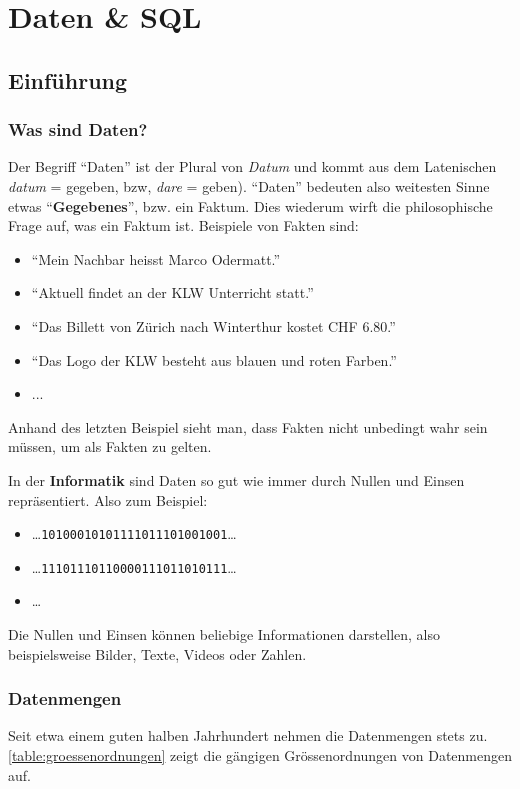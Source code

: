 \chapter{Daten \& SQL}\label{ch:Lektion}
\section{Einführung}

\subsection{Was sind Daten?}

Der Begriff ``Daten'' ist der Plural von \textit{Datum} und kommt aus dem Latenischen \textit{datum} = gegeben, bzw, \textit{dare} = geben). ``Daten'' bedeuten also weitesten Sinne etwas ``\textbf{Gegebenes}'', bzw. ein Faktum. Dies wiederum wirft die philosophische Frage auf, was ein Faktum ist. Beispiele von Fakten sind:
\begin{itemize}
	\item ``Mein Nachbar heisst Marco Odermatt.''
	\item ``Aktuell findet an der KLW Unterricht statt.''
	\item ``Das Billett von Zürich nach Winterthur kostet CHF 6.80.''
	\item ``Das Logo der KLW besteht aus blauen und roten Farben.''
	\item ...
\end{itemize}
Anhand des letzten Beispiel sieht man, dass Fakten nicht unbedingt wahr sein müssen, um als Fakten zu gelten.

In der \textbf{Informatik} sind Daten so gut wie immer durch Nullen und Einsen repräsentiert. Also zum Beispiel:
\begin{itemize}
	\item \ldots\verb|10100010101111011101001001|\ldots
	\item \ldots\verb|11101110110000111011010111|\ldots
	\item \ldots
\end{itemize}
Die Nullen und Einsen können beliebige Informationen darstellen, also beispielsweise Bilder, Texte, Videos oder Zahlen.

\subsection{Datenmengen}
Seit etwa einem guten halben Jahrhundert nehmen die Datenmengen stets zu. \cref{table:groessenordnungen} zeigt die gängigen Grössenordnungen von Datenmengen auf.

